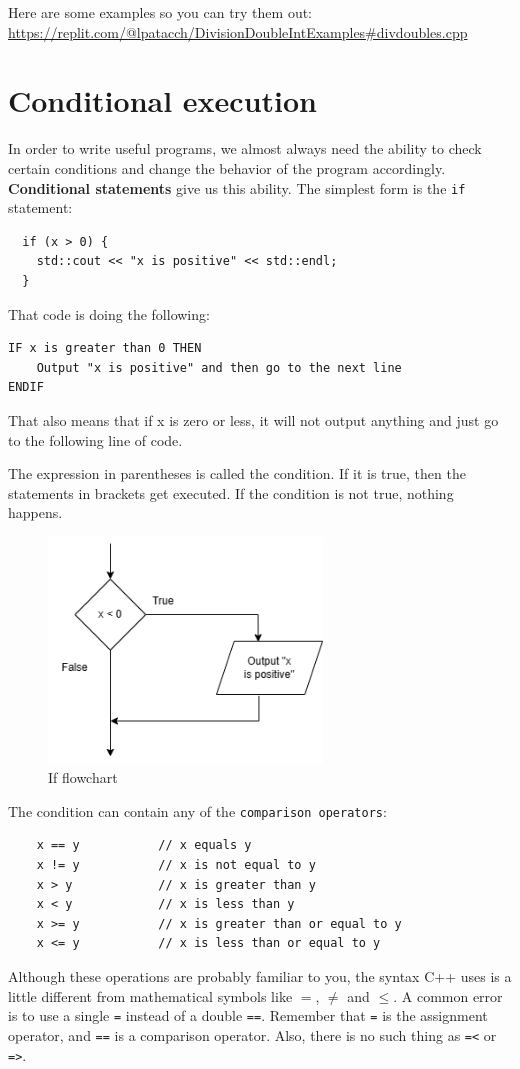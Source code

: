 Here are some examples so you can try them out: \url{https://replit.com/@lpatacch/DivisionDoubleIntExamples#divdoubles.cpp }

\section{Conditional execution}

In order to write useful programs, we almost always need the ability to check certain conditions and change the behavior of the program accordingly.  {\bf Conditional statements} give us this ability.  The simplest form is the {\tt if} statement:

\begin{lstlisting}
  if (x > 0) {
    std::cout << "x is positive" << std::endl;
  }
\end{lstlisting}
%
That code is doing the following:
\begin{verbatim}
IF x is greater than 0 THEN
    Output "x is positive" and then go to the next line
ENDIF
\end{verbatim}
That also means that if x is zero or less, it will not output anything and just go to the following line of code. 

The expression in parentheses is called the condition.
If it is true, then the statements in brackets get executed.
If the condition is not true, nothing happens.

\begin{figure}[h]
    \centering
    \includegraphics[height=6cm]{images/ifflow.png}
    \caption{If flowchart}
    \label{fig:ifflow}
\end{figure}


The condition can contain any of the {\tt comparison operators}:

\begin{lstlisting}
    x == y           // x equals y
    x != y           // x is not equal to y
    x > y            // x is greater than y
    x < y            // x is less than y
    x >= y           // x is greater than or equal to y
    x <= y           // x is less than or equal to y
\end{lstlisting}
%
Although these operations are probably familiar to you, the
syntax C++ uses is a little different from mathematical
symbols like $=$, $\neq$ and $\le$.  A common error is
to use a single {\tt =} instead of a double {\tt ==}.  Remember
that {\tt =} is the assignment operator, and {\tt ==} is
a comparison operator.  Also, there is no such thing as
{\tt =<} or {\tt =>}.

